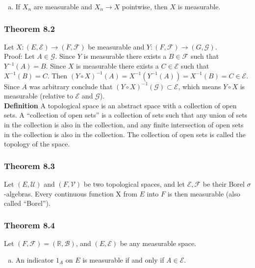 \documentclass{article}
\begin{document}
{\begin{enumerate}[a)]
\item If $X_n$ are measurable and $X_n \rightarrow X$ pointwise, then $X$ is measurable.
\end{enumerate}

\subsubsection*{Theorem 8.2}

Let $X: (E,\mathcal{E}) \rightarrow (F, \mathcal{F})$ be measurable and $Y: (F, \mathcal{F}) \rightarrow (G, \mathcal{G})$. \\

Proof: Let $A \in \mathcal{G}$. Since $Y$ is measurable there exists a $B \in \mathcal{F}$ such that $Y^{-1}(A) = B$. Since $X$ is measurable there exists a $C \in \mathcal{E}$ such that $X^{-1}(B) = C$. Then $(Y\circ X)^{-1}(A) = X^{-1}(Y^{-1}(A)) = X^{-1}(B) = C \in \mathcal{E}$. Since $A$ was arbitrary conclude that $(Y \circ X)^{-1}(\mathcal{G}) \subset \mathcal{E}$, which means $Y \circ X$ is measurable (relative to $\mathcal{E}$ and $\mathcal{G}$). \\

\textbf{Definition} A topological space is an abstract space with a collection of open sets. A “collection of open sets” is a collection of sets such that any union of sets in the collection is also in the collection, and any finite intersection of open sets in the collection is also in the collection. The collection of open sets is called the topology of the space.

\subsubsection*{Theorem 8.3}

Let $(E, \mathcal{U})$ and $(F, \mathcal{V})$ be two topological spaces, and let $\mathcal{E}, \mathcal{F}$ be their Borel $\sigma$-algebras. Every continuous function X from $E$ into $F$ is then measurable (also called “Borel”).

\subsubsection*{Theorem 8.4}

Let $(F, \mathcal{F}) = (\mathbb{R}, \mathcal{B})$, and $(E, \mathcal{E})$ be any measurable space.

\begin{enumerate}[a)]

\item An indicator $1_A$ on $E$ is measurable if and only if $A\in \mathcal{E}$. 


\end{enumerate}}
\end{document}
